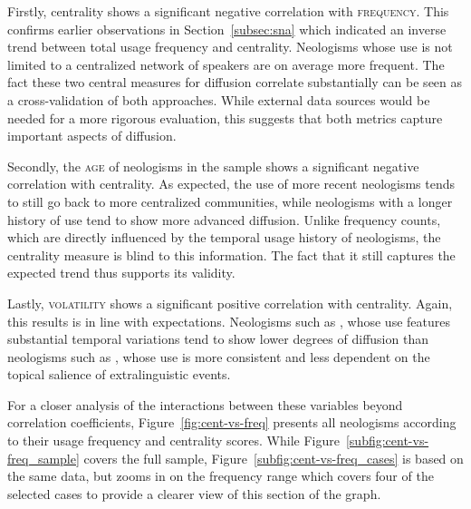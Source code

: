 \documentclass[
  a4paper,
  abstract=on,
  captions=tableabove
  ]{scrartcl}
\begin{document}
    Firstly, centrality shows a significant negative correlation with \textsc{frequency}. This confirms earlier observations in Section~\ref{subsec:sna} which indicated an inverse trend between total usage frequency and centrality. Neologisms whose use is not limited to a centralized network of speakers are on average more frequent. The fact these two central measures for diffusion correlate substantially can be seen as a cross-validation of both approaches. While external data sources would be needed for a more rigorous evaluation, this suggests that both metrics capture important aspects of diffusion.

    Secondly, the \textsc{age} of neologisms in the sample shows a significant negative correlation with centrality. As expected, the use of more recent neologisms tends to still go back to more centralized communities, while neologisms with a longer history of use tend to show more advanced diffusion. Unlike frequency counts, which are directly influenced by the temporal usage history of neologisms, the centrality measure is blind to this information. The fact that it still captures the expected trend thus supports its validity.  

    Lastly, \textsc{volatility} shows a significant positive correlation with centrality. Again, this results is in line with expectations. Neologisms such as , whose use features substantial temporal variations tend to show lower degrees of diffusion than neologisms such as , whose use is more consistent and less dependent on the topical salience of extralinguistic events. 

    For a closer analysis of the interactions between these variables beyond correlation coefficients, Figure~\ref{fig:cent-vs-freq} presents all neologisms according to their usage frequency and centrality scores. While Figure~\ref{subfig:cent-vs-freq_sample} covers the full sample, Figure~\ref{subfig:cent-vs-freq_cases} is based on the same data, but zooms in on the frequency range which covers four of the selected cases to provide a clearer view of this section of the graph. 
\end{document}
